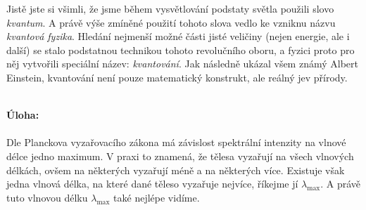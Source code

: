 \documentclass{../../../../style/mkimain}
\begin{document}
Jistě jste si všimli, že jsme během vysvětlování podstaty světla použili slovo \textit{kvantum}.
A právě výše zmíněné použití tohoto slova vedlo ke vzniknu názvu \textit{kvantová fyzika}.
Hledání nejmenší možné části jisté veličiny (nejen energie, ale i další) se stalo podstatnou technikou tohoto revolučního oboru,
a fyzici proto pro něj vytvořili speciální název: \textit{kvantování}.
Jak následně ukázal všem známý Albert Einstein, kvantování není pouze matematický konstrukt, ale reálný jev přírody.
\\
\\
\begin{center}
\end{center}
\textbf{Úloha:}
\\
\\
Dle Planckova vyzařovacího zákona má závislost spektrální intenzity na vlnové délce jedno maximum.
V praxi to znamená, že tělesa vyzařují na všech vlnových délkách, ovšem na některých vyzařují méně a na některých více.
Existuje však jedna vlnová délka, na které dané těleso vyzařuje nejvíce, říkejme jí $\lambda_\mathrm{max}$.
A právě tuto vlnovou délku $\lambda_\mathrm{max}$ také nejlépe vidíme.
\end{document}
